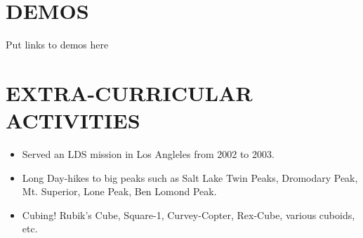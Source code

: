 \documentclass[margin]{res}
\begin{document}
\begin{resume}
\begin{itemize}
		\end{itemize}

\section{DEMOS}
		Put links to demos here \\

\section{EXTRA-CURRICULAR \\ ACTIVITIES}
		\begin{itemize}\itemsep -2pt %
		\item Served an LDS mission in Los Angleles from 2002 to 2003.
		\item Long Day-hikes to big peaks such as Salt Lake Twin Peaks, Dromodary Peak, Mt. Superior, Lone Peak, Ben Lomond Peak.
		\item Cubing!  Rubik's Cube, Square-1, Curvey-Copter, Rex-Cube, various cuboids, etc.
		\end{itemize}

\end{resume}
\end{document}
